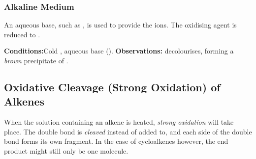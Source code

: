 


		\subsubsection{Alkaline Medium}

		An aqueous base, such as , is used to provide the  ions. The oxidising agent  is reduced to
		.

		\vspace{1.5em}
		\vbox{\textbf{Conditions:}\tabto{35mm}Cold , aqueous base ().}	%
		\vbox{\textbf{Observations:}  decolourises, forming
			a {\textit{\color{Brown}brown}} precipitate of .}





	\pagebreak
	\subsection{Oxidative Cleavage (Strong Oxidation) of Alkenes}

		When the  solution containing an alkene is heated, \textit{strong oxidation} will take place. The double bond is
		\textit{cleaved} instead of added to, and each side of the double bond forms its own fragment. In the case of cycloalkenes
		however, the end product might still only be one molecule.

